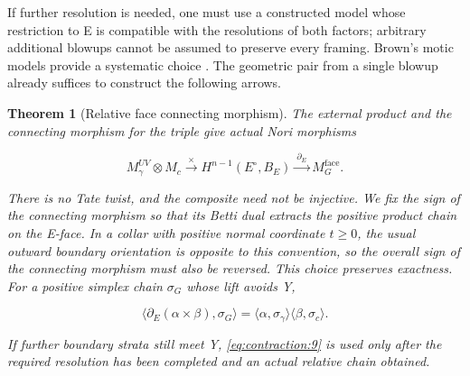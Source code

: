 \documentclass[11pt,a4paper,oneside]{article}
\theoremstyle{plain}
\newtheorem{theorem}{Theorem}[section]
\theoremstyle{definition}
\theoremstyle{remark}
\numberwithin{equation}{section}
\begin{document}
If further resolution is needed, one must use a constructed model whose restriction to E is compatible with the resolutions of both factors; arbitrary additional blowups cannot be assumed to preserve every framing. Brown's motic models provide a systematic choice \cite{browncosmic}. The geometric pair from a single blowup already suffices to construct the following arrows.

\begin{theorem}[Relative face connecting morphism]

\label{thm:contraction:3.1} The external product and the connecting morphism for the triple give actual Nori morphisms

\begin{equation}
M_\gamma^{UV}\otimes M_c
 \xrightarrow{\ \times\ }H^{n-1}(E^\circ,B_E)
 \xrightarrow{\ \partial_E\ }M_G^{\mathrm{face}}.                \label{eq:contraction:8}
\end{equation}

There is no Tate twist, and the composite need not be injective. We fix the sign of the connecting morphism so that its Betti dual extracts the positive product chain on the E-face. In a collar with positive normal coordinate \(t\ge 0\), the usual outward boundary orientation is opposite to this convention, so the overall sign of the connecting morphism must also be reversed. This choice preserves exactness. For a positive simplex chain \(\sigma _G\) whose lift avoids Y,

\begin{equation}
\langle\partial_E(\alpha\times\beta),\sigma_G\rangle
    =\langle\alpha,\sigma_\gamma\rangle
       \langle\beta,\sigma_c\rangle.                             \label{eq:contraction:9}
\end{equation}

If further boundary strata still meet Y, \eqref{eq:contraction:9} is used only after the required resolution has been completed and an actual relative chain obtained.

\end{theorem}
\end{document}
